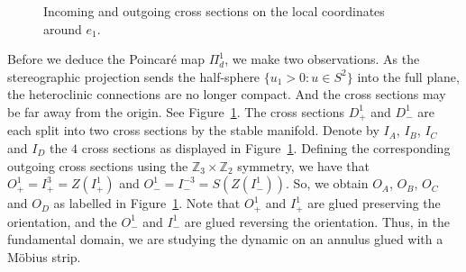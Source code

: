 \documentclass{article}
\theoremstyle{definition}
\begin{document}
\begin{figure}[ht]
	\centering
{}
\caption{Incoming and outgoing cross sections on the local coordinates around $e_1$.}
	\label{fig:poincaremap}
\end{figure}


Before we deduce the Poincaré map $\Pi^1_d$, we make two observations.
As the stereographic projection sends the half-sphere $\{u_1>0:u\in S^2\}$ into the full plane, the heteroclinic connections are no longer compact.
And the cross sections may be far away from the origin. 
See Figure~\ref{fig:poincaremap}.
The cross sections $D^1_{+}$ and $ D^1_{-}$ are each split into two cross sections by the stable manifold. 
Denote by $I_A$, $I_B$, $I_C$ and $I_D$ the $4$ cross sections as displayed in Figure~\ref{fig:poincaremap}. 
Defining the corresponding outgoing cross sections using the $\mathbb{Z}_3\times \mathbb{Z}_2$ symmetry, we have that $O^1_+=I^{3}_{+}=Z(I^{1}_{+})$ and $O^1 _-= I^{-3}_{-}= S(Z(I^{1}_{-}))$.
So, we obtain $O_A$, $O_B$, $O_C$ and $O_D$ as labelled in Figure~\ref{fig:poincaremap}.
Note that $O^1_+$ and $I^{1}_{+}$ are glued preserving the orientation, and the $O^1_-$ and $I^{1}_{-}$ are glued reversing the orientation.
Thus, in the fundamental domain, we are studying the dynamic on an annulus glued with a Möbius strip. 
\end{document}
